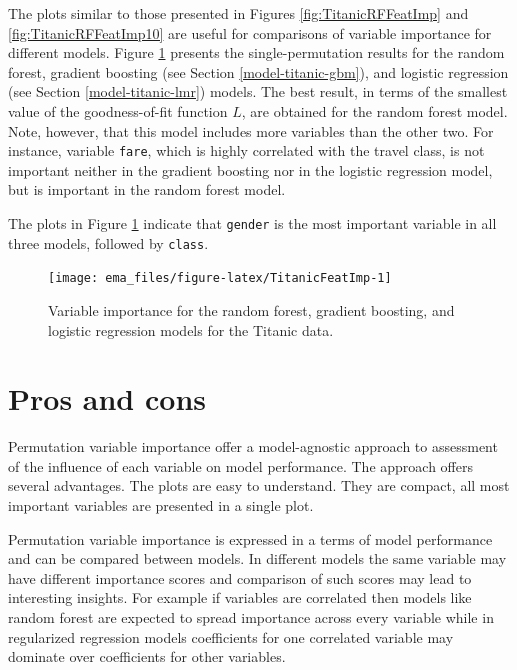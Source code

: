 \documentclass[]{krantz}
\begin{document}
The plots similar to those presented in Figures \ref{fig:TitanicRFFeatImp} and \ref{fig:TitanicRFFeatImp10} are useful for comparisons of variable importance for different models.
Figure \ref{fig:TitanicFeatImp} presents the single-permutation results for the random forest, gradient boosting (see Section \ref{model-titanic-gbm}), and logistic regression (see Section \ref{model-titanic-lmr}) models. The best result, in terms of the smallest value of the goodness-of-fit function \(L\), are obtained for the random forest model. Note, however, that this model includes more variables than the other two. For instance, variable \texttt{fare}, which is highly correlated with the travel class, is not important neither in the gradient boosting nor in the logistic regression model, but is important in the random forest model.

The plots in Figure \ref{fig:TitanicFeatImp} indicate that \texttt{gender} is the most important variable in all three models, followed by \texttt{class}.

\begin{figure}
\texttt{[image: ema\_files/figure-latex/TitanicFeatImp-1]} \caption{Variable importance for the random forest, gradient boosting, and logistic regression models for the Titanic data.}\label{fig:TitanicFeatImp}
\end{figure}

\hypertarget{featureImportanceProsCons}{%
\section{Pros and cons}\label{featureImportanceProsCons}}

Permutation variable importance offer a model-agnostic approach to assessment of the influence of each variable on model performance. The approach offers several advantages. The plots are easy to understand. They are compact, all most important variables are presented in a single plot.

Permutation variable importance is expressed in a terms of model performance and can be compared between models. In different models the same variable may have different importance scores and comparison of such scores may lead to interesting insights. For example if variables are correlated then models like random forest are expected to spread importance across every variable while in regularized regression models coefficients for one correlated variable may dominate over coefficients for other variables.
\end{document}
